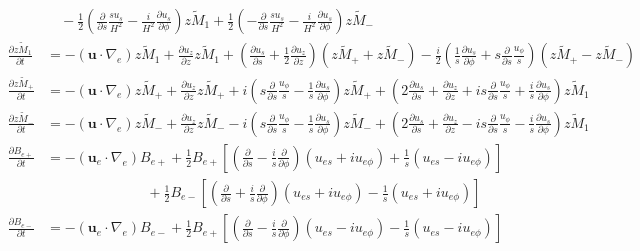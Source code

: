 \begin{align*}
    &\quad -\frac{1}{2} \left(\frac{\partial}{\partial s} \frac{su_s}{H^2} - \frac{i}{H^2} \frac{\partial u_s}{\partial \phi}\right) \widetilde{zM_1} + \frac{1}{2} \left(-\frac{\partial}{\partial s}\frac{su_s}{H^2} - \frac{i}{H^2}\frac{\partial u_s}{\partial \phi}\right) \widetilde{zM_-} \\
    \frac{\partial \widetilde{zM_1}}{\partial t} &= -(\mathbf{u}\cdot \nabla_e) \widetilde{zM_1} + \frac{\partial u_z}{\partial z} \widetilde{zM_1} + \left(\frac{\partial u_s}{\partial s} + \frac{1}{2}\frac{\partial u_z}{\partial z}\right) \left(\widetilde{zM_+} + \widetilde{zM_-}\right) - \frac{i}{2}\left(\frac{1}{s}\frac{\partial u_s}{\partial \phi} + s \frac{\partial}{\partial s}\frac{u_\phi}{s}\right) \left(\widetilde{zM_+} - \widetilde{zM_-}\right) \\
    \frac{\partial \widetilde{zM_+}}{\partial t} &= - (\mathbf{u}\cdot \nabla_e) \widetilde{zM_+} + \frac{\partial u_z}{\partial z} \widetilde{zM_+} + i \left(s\frac{\partial}{\partial s}\frac{u_\phi}{s} - \frac{1}{s}\frac{\partial u_s}{\partial \phi}\right) \widetilde{zM_+} + \left(2\frac{\partial u_s}{\partial s} + \frac{\partial u_z}{\partial z} + is \frac{\partial}{\partial s}\frac{u_\phi}{s}+ \frac{i}{s}\frac{\partial u_s}{\partial \phi}\right) \widetilde{zM_1} \\
    \frac{\partial \widetilde{zM_-}}{\partial t} &= - (\mathbf{u}\cdot \nabla_e) \widetilde{zM_-} + \frac{\partial u_z}{\partial z} \widetilde{zM_-} - i \left(s\frac{\partial}{\partial s}\frac{u_\phi}{s} - \frac{1}{s}\frac{\partial u_s}{\partial \phi}\right) \widetilde{zM_-} + \left(2\frac{\partial u_s}{\partial s} + \frac{\partial u_z}{\partial z} - is \frac{\partial}{\partial s}\frac{u_\phi}{s}- \frac{i}{s}\frac{\partial u_s}{\partial \phi}\right) \widetilde{zM_1} \\
    \frac{\partial B_{e+}}{\partial t} &= - \left(\mathbf{u}_e \cdot \nabla_e\right) B_{e+} + \frac{1}{2} B_{e+} \left[\left(\frac{\partial}{\partial s} - \frac{i}{s}\frac{\partial}{\partial \phi}\right) \left(u_{es} + iu_{e\phi}\right) + \frac{1}{s} \left(u_{es} - i u_{e\phi}\right)\right] \\ 
    &\qquad \qquad \qquad \quad \, + \frac{1}{2} B_{e-} \left[\left(\frac{\partial}{\partial s} + \frac{i}{s}\frac{\partial}{\partial \phi}\right) \left(u_{es} + iu_{e\phi}\right) - \frac{1}{s} \left(u_{es} + i u_{e\phi}\right)\right] \\ 
    \frac{\partial B_{e-}}{\partial t} &= - \left(\mathbf{u}_e \cdot \nabla_e\right) B_{e-} + \frac{1}{2} B_{e+} \left[\left(\frac{\partial}{\partial s} - \frac{i}{s}\frac{\partial}{\partial \phi}\right) \left(u_{es} - iu_{e\phi}\right) - \frac{1}{s} \left(u_{es} - i u_{e\phi}\right)\right] \\ 

\end{align*}
